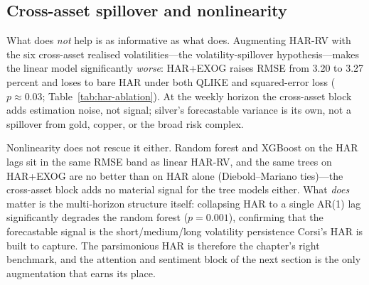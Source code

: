\documentclass[12pt, a4paper]{article}
\begin{document}
\subsection{Cross-asset spillover and nonlinearity}

What does \emph{not} help is as informative as what does. Augmenting HAR-RV with the six
cross-asset realised volatilities---the volatility-spillover hypothesis---makes the linear
model significantly \emph{worse}: HAR+EXOG raises RMSE from 3.20 to 3.27 percent and loses to
bare HAR under both QLIKE and squared-error loss (\(p\approx 0.03\);
Table~\ref{tab:har-ablation}). At the weekly horizon the
cross-asset block adds estimation noise, not signal; silver's forecastable variance is its
own, not a spillover from gold, copper, or the broad risk complex.

Nonlinearity does not rescue it either. Random forest and XGBoost on the HAR lags sit in the
same RMSE band as linear HAR-RV, and the same trees on HAR+EXOG are no better than on HAR
alone (Diebold--Mariano ties)---the cross-asset block adds no material signal for the tree models either. What
\emph{does} matter is the multi-horizon structure itself: collapsing HAR to a single AR(1) lag
significantly degrades the random forest (\(p=0.001\)), confirming that the forecastable
signal is the short/medium/long volatility persistence Corsi's HAR is built to capture. The
parsimonious HAR is therefore the chapter's right benchmark, and the attention and sentiment
block of the next section is the only augmentation that earns its place.
\end{document}
